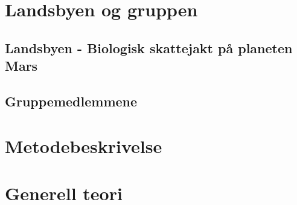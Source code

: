 \documentclass[DIV=calc, paper=a4, fontsize=12pt]{scrartcl}	 %
\begin{document}



\section{Landsbyen og gruppen}



\subsection{Landsbyen - Biologisk skattejakt på planeten Mars}



\subsection{Gruppemedlemmene}












\section{Metodebeskrivelse}







\section{Generell teori}
\end{document}
